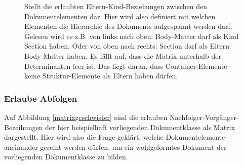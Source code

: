  
\begin{figure}[h!]
\centering
{}
\caption[Matrix über Eltern-Kind-Beziehungen]{ Stellt die erlaubten Eltern-Kind-Beziehungen zwischen den Dokumentelementen dar. Hier wird also definiert mit welchen Elementen die Hierarchie des Dokuments aufgespannt werden darf. Gelesen wird es z.B. von links nach oben: Body-Matter darf als Kind Section haben. Oder von oben nach rechts: Section darf als Eltern Body-Matter haben. Es fällt auf, dass die Matrix unterhalb der Determinanten leer ist. Das liegt daran, dass Container-Elemente keine Struktur-Elemente als Eltern haben dürfen. }\label{matrixkind}
\end{figure}
 
\subsubsection{Erlaube Abfolgen}\label{}

 
Auf Abbildung \ref{matrixgeschwister} sind die erlauben Nachfolger-Vorgänger-Bezeihungen der hier beispielhaft vorliegenden Dokumentklasse als Matrix dargestellt. Hier wird also die Frage geklärt, welche Dokumentelemente aneinander gereiht werden dürfen, um ein wohlgeformtes Dokument der vorliegenden Dokumentklasse zu bilden.

